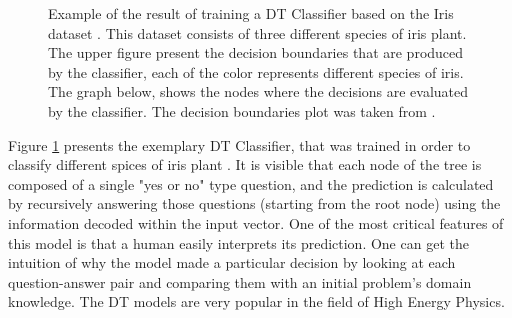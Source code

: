 \begin{figure}%
    \centering
    \qquad
    \caption{Example of the result of training a DT Classifier based on the Iris dataset \cite{fisher} \cite{anderson}. This dataset consists of three different species of iris plant. The upper figure present the decision boundaries that are produced by the classifier, each of the color represents different species of iris. The graph below, shows the nodes where the decisions are evaluated by the classifier. The decision boundaries plot was taken from \cite{DecisionTrees}. }%
    \label{fig:Decision Tree}%
\end{figure}

Figure \ref{fig:Decision Tree} presents the exemplary DT Classifier, that was trained in order to classify different spices of iris plant \cite{fisher} \cite{anderson}. It is visible that each node of the tree is composed of a single "yes or no" type question, and the prediction is calculated by recursively answering those questions (starting from the root node) using the information decoded within the input vector. One of the most critical features of this model is that a human easily interprets its prediction. One can get the intuition of why the model made a particular decision by looking at each question-answer pair and comparing them with an initial problem's domain knowledge. The DT models are very popular in the field of High Energy Physics.

